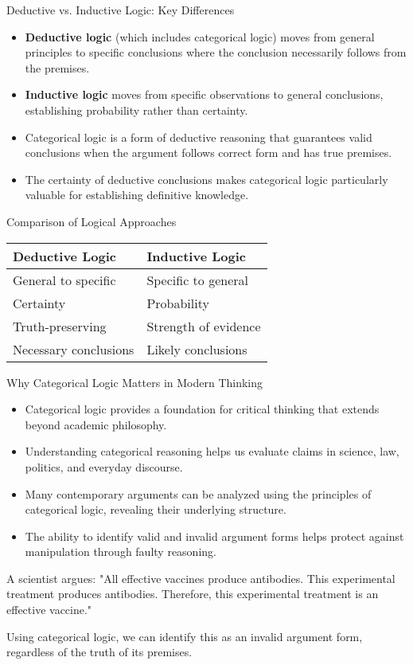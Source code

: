 \documentclass{beamer}
\begin{document}
	\begin{frame}{Deductive vs. Inductive Logic: Key Differences}
		\begin{itemize}
			\item \textbf{Deductive logic} (which includes categorical logic) moves from general principles to specific conclusions where the conclusion necessarily follows from the premises.
			\item \textbf{Inductive logic} moves from specific observations to general conclusions, establishing probability rather than certainty.
			\item Categorical logic is a form of deductive reasoning that guarantees valid conclusions when the argument follows correct form and has true premises.
			\item The certainty of deductive conclusions makes categorical logic particularly valuable for establishing definitive knowledge.
		\end{itemize}
		
		\begin{block}{Comparison of Logical Approaches}
			\scriptsize
			\begin{tabular}{|l|l|}
				\hline
				\textbf{Deductive Logic} & \textbf{Inductive Logic} \\
				\hline
				General to specific & Specific to general \\
				Certainty & Probability \\
				Truth-preserving & Strength of evidence \\
				Necessary conclusions & Likely conclusions \\
				\hline
			\end{tabular}
		\end{block}
	\end{frame}
	
	\begin{frame}{Why Categorical Logic Matters in Modern Thinking}
		\begin{itemize}
			\item Categorical logic provides a foundation for critical thinking that extends beyond academic philosophy.
			\item Understanding categorical reasoning helps us evaluate claims in science, law, politics, and everyday discourse.
			\item Many contemporary arguments can be analyzed using the principles of categorical logic, revealing their underlying structure.
			\item The ability to identify valid and invalid argument forms helps protect against manipulation through faulty reasoning.
		\end{itemize}
		
		\begin{example}
			A scientist argues: "All effective vaccines produce antibodies. This experimental treatment produces antibodies. Therefore, this experimental treatment is an effective vaccine."
			
			Using categorical logic, we can identify this as an invalid argument form, regardless of the truth of its premises.
		\end{example}
	\end{frame}
	
\end{document}
